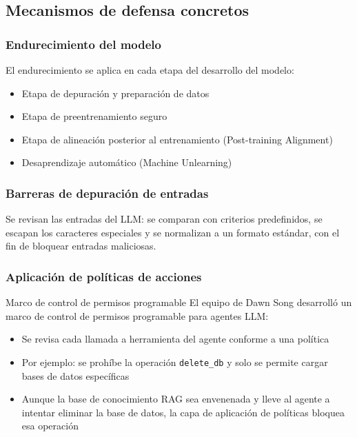 \documentclass[a4paper]{article}
\begin{document}
\subsection{Mecanismos de defensa concretos}

\subsubsection{Endurecimiento del modelo}

El endurecimiento se aplica en cada etapa del desarrollo del modelo:
\begin{itemize}
    \item Etapa de depuración y preparación de datos
    \item Etapa de preentrenamiento seguro
    \item Etapa de alineación posterior al entrenamiento (Post-training Alignment)
    \item Desaprendizaje automático (Machine Unlearning)
\end{itemize}

\subsubsection{Barreras de depuración de entradas}

Se revisan las entradas del LLM: se comparan con criterios predefinidos, se escapan los caracteres especiales y se normalizan a un formato estándar, con el fin de bloquear entradas maliciosas.

\subsubsection{Aplicación de políticas de acciones}

\begin{importantbox}{Marco de control de permisos programable}
El equipo de Dawn Song desarrolló un marco de control de permisos programable para agentes LLM:
\begin{itemize}
    \item Se revisa cada llamada a herramienta del agente conforme a una política
    \item Por ejemplo: se prohíbe la operación \texttt{delete\_db} y solo se permite cargar bases de datos específicas
    \item Aunque la base de conocimiento RAG sea envenenada y lleve al agente a intentar eliminar la base de datos, la capa de aplicación de políticas bloquea esa operación
\end{itemize}
\end{importantbox}
\end{document}
